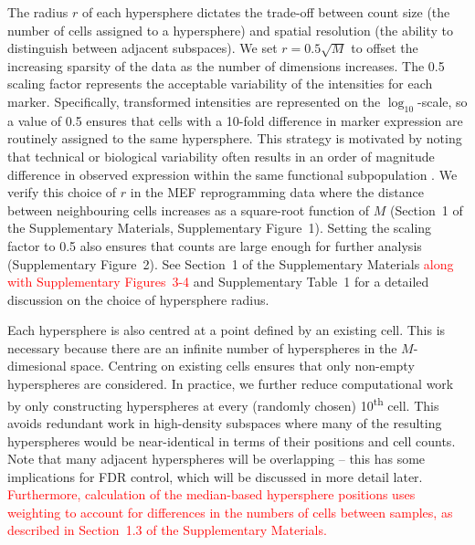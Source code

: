 \documentclass{article}
\newcommand\revised[1]{\textcolor{red}{#1}}
\newcommand{\supphyperradverify}{1}
\newcommand{\suppweightmedian}{1.3}
\newcommand{\suppfighyperrad}{1}
\newcommand{\suppfighypertol}{2}
\newcommand{\suppfigradsim}{3-4}
\newcommand{\supptabparam}{1}
\begin{document}

The radius $r$ of each hypersphere dictates the trade-off between count size (the number of cells assigned to a hypersphere) and spatial resolution (the ability to distinguish between adjacent subspaces).
We set $r=0.5\sqrt{M}$ to offset the increasing sparsity of the data as the number of dimensions increases.
The 0.5 scaling factor represents the acceptable variability of the intensities for each marker.
Specifically, transformed intensities are represented on the $\log_{10}$-scale, so a value of 0.5 ensures that cells with a 10-fold difference in marker expression are routinely assigned to the same hypersphere.
This strategy is motivated by noting that technical or biological variability often results in an order of magnitude difference in observed expression within the same functional subpopulation \cite{ornatsky2008study,zunder2015continuous,zunder2015palladium}.
We verify this choice of $r$ in the MEF reprogramming data where the distance between neighbouring cells increases as a square-root function of $M$ (Section~\supphyperradverify{} of the Supplementary Materials, Supplementary Figure~\suppfighyperrad{}).
Setting the scaling factor to 0.5 also ensures that counts are large enough for further analysis (Supplementary Figure~\suppfighypertol{}).
See Section~\supphyperradverify{} of the Supplementary Materials \revised{along with Supplementary Figures~\suppfigradsim{}} and Supplementary Table~\supptabparam{} for a detailed discussion on the choice of hypersphere radius.

Each hypersphere is also centred at a point defined by an existing cell.
This is necessary because there are an infinite number of hyperspheres in the $M$-dimesional space.
Centring on existing cells ensures that only non-empty hyperspheres are considered.
In practice, we further reduce computational work by only constructing hyperspheres at every (randomly chosen) 10\textsuperscript{th} cell.
This avoids redundant work in high-density subspaces where many of the resulting hyperspheres would be near-identical in terms of their positions and cell counts.
Note that many adjacent hyperspheres will be overlapping -- this has some implications for FDR control, which will be discussed in more detail later.
\revised{Furthermore, calculation of the median-based hypersphere positions uses weighting to account for differences in the numbers of cells between samples, as described in Section~\suppweightmedian{} of the Supplementary Materials.}
\end{document}

